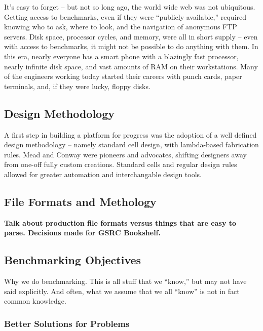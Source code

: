\documentclass[sigconf]{acmart}
\begin{document}
It's easy to forget -- but not so long ago, the
world wide web was not ubiquitous. Getting access to benchmarks, even if they
were ``publicly available,'' required knowing who to ask, where to
look, and the navigation of anonymous FTP servers.  Disk space,
processor cycles, and memory, were all in short supply -- even with
access to benchmarks, it might not be possible to do anything with them.
In this era, nearly everyone has a smart phone with a blazingly fast
processor, nearly infinite disk space, and vast amounts of
RAM on their workstations.  Many of the engineers
working today started their careers with punch cards,
paper terminals, and, if they were lucky, floppy disks.

\subsection{Design Methodology}

A first step in building a platform for progress was the adoption
of a well defined design methodology -- namely standard cell design,
with lambda-based fabrication rules.  Mead and Conway were pioneers
and advocates\cite{Mead93}, shifting designers away from one-off
fully custom creations.  Standard cells and regular design rules allowed
for greater automation and interchangable design tools.

\subsection{File Formats and Methology}

{\bf Talk about production file formats versus things that
  are easy to parse.  Decisions made for GSRC Bookshelf.}

\cite{Caldwell000693}\cite{umichbookshelf}

\subsection{Benchmarking Objectives}

Why we do benchmarking.  This is all stuff that we ``know,'' but
may not have said explicitly.  And often, what we assume that we
all ``know'' is not in fact common knowledge.


\subsubsection{Better Solutions for Problems}
\end{document}

